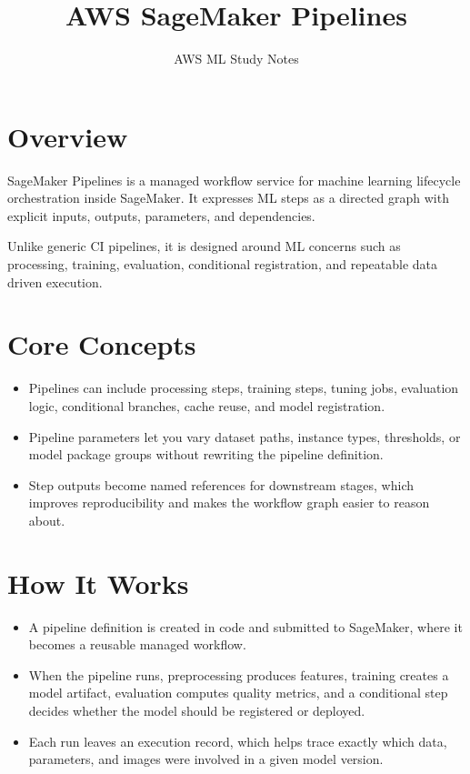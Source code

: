 \documentclass[10pt,twocolumn]{article}
\begin{document}
\title{\vspace{-1.6cm}AWS SageMaker Pipelines}
\author{AWS ML Study Notes}
\date{}
\maketitle
\small

\section*{Overview}
SageMaker Pipelines is a managed workflow service for machine learning lifecycle orchestration inside SageMaker. It expresses ML steps as a directed graph with explicit inputs, outputs, parameters, and dependencies.

Unlike generic CI pipelines, it is designed around ML concerns such as processing, training, evaluation, conditional registration, and repeatable data driven execution.

\section*{Core Concepts}
\begin{itemize}
\item Pipelines can include processing steps, training steps, tuning jobs, evaluation logic, conditional branches, cache reuse, and model registration.
\item Pipeline parameters let you vary dataset paths, instance types, thresholds, or model package groups without rewriting the pipeline definition.
\item Step outputs become named references for downstream stages, which improves reproducibility and makes the workflow graph easier to reason about.
\end{itemize}

\section*{How It Works}
\begin{itemize}
\item A pipeline definition is created in code and submitted to SageMaker, where it becomes a reusable managed workflow.
\item When the pipeline runs, preprocessing produces features, training creates a model artifact, evaluation computes quality metrics, and a conditional step decides whether the model should be registered or deployed.
\item Each run leaves an execution record, which helps trace exactly which data, parameters, and images were involved in a given model version.
\end{itemize}
\end{document}
